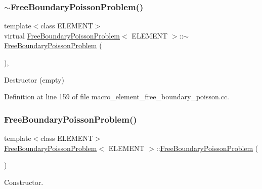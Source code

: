 \subsubsection{\texorpdfstring{$\sim$\+Free\+Boundary\+Poisson\+Problem()}{~FreeBoundaryPoissonProblem()}\hspace{0.1cm}{\footnotesize\ttfamily [1/2]}}
{\footnotesize\ttfamily template$<$class E\+L\+E\+M\+E\+NT$>$ \\
virtual \hyperlink{classFreeBoundaryPoissonProblem}{Free\+Boundary\+Poisson\+Problem}$<$ E\+L\+E\+M\+E\+NT $>$\+::$\sim$\hyperlink{classFreeBoundaryPoissonProblem}{Free\+Boundary\+Poisson\+Problem} (\begin{DoxyParamCaption}{ }\end{DoxyParamCaption})\hspace{0.3cm}{\ttfamily [inline]}, {\ttfamily [virtual]}}



Destructor (empty) 



Definition at line 159 of file macro\+\_\+element\+\_\+free\+\_\+boundary\+\_\+poisson.\+cc.

\mbox{\label{classFreeBoundaryPoissonProblem_a0efe7c342eea790fc0240830bc3c4ebc}} 
\subsubsection{\texorpdfstring{Free\+Boundary\+Poisson\+Problem()}{FreeBoundaryPoissonProblem()}\hspace{0.1cm}{\footnotesize\ttfamily [2/2]}}
{\footnotesize\ttfamily template$<$class E\+L\+E\+M\+E\+NT$>$ \\
\hyperlink{classFreeBoundaryPoissonProblem}{Free\+Boundary\+Poisson\+Problem}$<$ E\+L\+E\+M\+E\+NT $>$\+::\hyperlink{classFreeBoundaryPoissonProblem}{Free\+Boundary\+Poisson\+Problem} (\begin{DoxyParamCaption}{ }\end{DoxyParamCaption})}



Constructor. 

\mbox{\label{classFreeBoundaryPoissonProblem_a5b75b8553f3dfed4e9a8996c1b13edf3}} 

